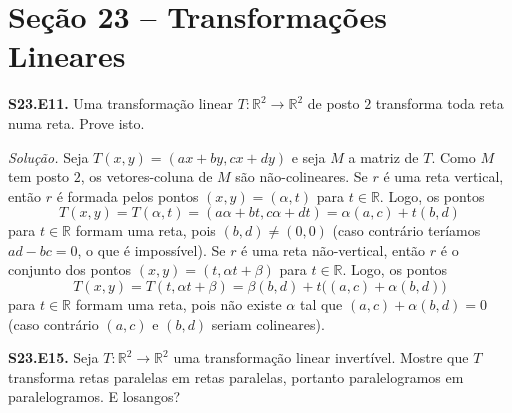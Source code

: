 \documentclass[a4paper,11pt]{article}
\newcommand{\R}{\mathbb{R}}
\begin{document}
\section*{Seção 23 -- Transformações Lineares}

\textbf{S23.E11.}
Uma transformação linear $T : \R^2 \to \R^2$ de posto $2$ transforma toda reta numa reta.
Prove isto.

\vspace{\baselineskip}

\emph{Solução.}
Seja $T(x,y) = (ax + by, cx + dy)$ e seja $M$ a matriz de $T$.
Como $M$ tem posto $2$, os vetores-coluna de $M$ são não-colineares.
Se $r$ é uma reta vertical, então $r$ é formada pelos pontos $(x,y) = (\alpha,t)$ para $t \in \R$.
Logo, os pontos
\[
  T(x,y) = T(\alpha, t) = (a \alpha + bt, c \alpha + dt) = \alpha(a, c) + t(b,d)
\]
para $t \in \R$ formam uma reta, pois $(b,d) \neq (0,0)$ (caso contrário teríamos $ad - bc = 0$, o que é impossível).
Se $r$ é uma reta não-vertical, então $r$ é o conjunto dos pontos $(x,y) = (t, \alpha t + \beta)$ para $t \in \R$.
Logo, os pontos
\[
  T(x,y) = T(t, \alpha t + \beta) = \beta(b,d) + t \big( (a,c) + \alpha (b,d) \big)
\]
para $t \in \R$ formam uma reta, pois não existe $\alpha$ tal que $(a,c) + \alpha(b,d) = 0$ (caso contrário $(a,c)$ e $(b,d)$ seriam colineares).

\vspace{\baselineskip}

\textbf{S23.E15.}
Seja $T : \R^2 \to \R^2$ uma transformação linear invertível.
Mostre que $T$ transforma retas paralelas em retas paralelas, portanto paralelogramos em paralelogramos.
E losangos?

\vspace{\baselineskip}
\end{document}

